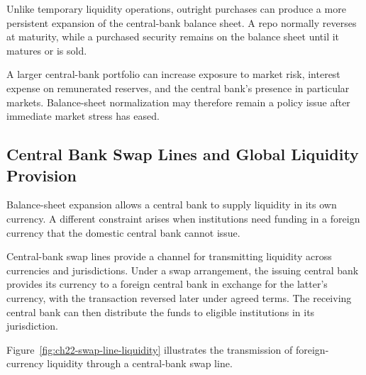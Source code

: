 Unlike temporary liquidity operations, outright purchases can produce a more persistent expansion of the central-bank balance sheet. A repo normally reverses at maturity, while a purchased security remains on the balance sheet until it matures or is sold.

A larger central-bank portfolio can increase exposure to market risk, interest expense on remunerated reserves, and the central bank's presence in particular markets. Balance-sheet normalization may therefore remain a policy issue after immediate market stress has eased.


\subsection{Central Bank Swap Lines and Global Liquidity Provision}

Balance-sheet expansion allows a central bank to supply liquidity in its own currency. A different constraint arises when institutions need funding in a foreign currency that the domestic central bank cannot issue.

Central-bank swap lines provide a channel for transmitting liquidity across currencies and jurisdictions. Under a swap arrangement, the issuing central bank provides its currency to a foreign central bank in exchange for the latter's currency, with the transaction reversed later under agreed terms. The receiving central bank can then distribute the funds to eligible institutions in its jurisdiction.

Figure~\ref{fig:ch22-swap-line-liquidity} illustrates the transmission of foreign-currency liquidity through a central-bank swap line.


